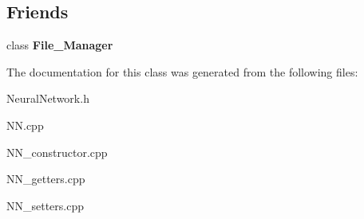 \subsection*{Friends}
\begin{DoxyCompactItemize}
\item 
\hypertarget{classNeural__Network_a96aa84fcda6b19a74fff9d19c16b07fe}{class {\bfseries File\-\_\-\-Manager}}\label{classNeural__Network_a96aa84fcda6b19a74fff9d19c16b07fe}

\end{DoxyCompactItemize}


The documentation for this class was generated from the following files\-:\begin{DoxyCompactItemize}
\item 
Neural\-Network.\-h\item 
N\-N.\-cpp\item 
N\-N\-\_\-constructor.\-cpp\item 
N\-N\-\_\-getters.\-cpp\item 
N\-N\-\_\-setters.\-cpp\end{DoxyCompactItemize}
